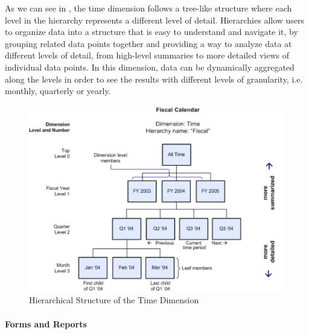 \documentclass[12pt,a4paper,openright,twoside]{book}
\begin{document}
As we can see in , the time dimension follows a tree-like structure where each level in the hierarchy represents a different level of detail. 
%
Hierarchies allow users to organize data into a structure that is easy to understand and navigate it, by grouping related data points together and providing a way to analyze data at different levels of detail, from high-level summaries to more detailed views of individual data points.
%
In this dimension, data can be dynamically aggregated along the levels in order to see the results with different levels of granularity, i.e. monthly, quarterly or yearly.

\begin{figure}[htbp]
	\centering
	\includegraphics[width=\linewidth]{figures/hierarchy.pdf}
	\caption{Hierarchical Structure of the Time Dimension}
	\label{fig:hierarchy}
\end{figure}

\paragraph{Forms and Reports}
\end{document}
